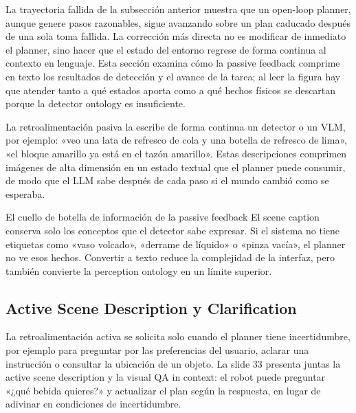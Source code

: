 La trayectoria fallida de la subsección anterior muestra que un open-loop planner, aunque genere pasos razonables, sigue avanzando sobre un plan caducado después de una sola toma fallida. La corrección más directa no es modificar de inmediato el planner, sino hacer que el estado del entorno regrese de forma continua al contexto en lenguaje. Esta sección examina cómo la passive feedback comprime en texto los resultados de detección y el avance de la tarea; al leer la figura hay que atender tanto a qué estados aporta como a qué hechos físicos se descartan porque la detector ontology es insuficiente.

La retroalimentación pasiva la escribe de forma continua un detector o un VLM, por ejemplo: «veo una lata de refresco de cola y una botella de refresco de lima», «el bloque amarillo ya está en el tazón amarillo». Estas descripciones comprimen imágenes de alta dimensión en un estado textual que el planner puede consumir, de modo que el LLM sabe después de cada paso si el mundo cambió como se esperaba.


\begin{knowledgebox}{El cuello de botella de información de la passive feedback}
El scene caption conserva solo los conceptos que el detector sabe expresar. Si el sistema no tiene etiquetas como «vaso volcado», «derrame de líquido» o «pinza vacía», el planner no ve esos hechos. Convertir a texto reduce la complejidad de la interfaz, pero también convierte la perception ontology en un límite superior.
\end{knowledgebox}

\subsection{Active Scene Description y Clarification}

La retroalimentación activa se solicita solo cuando el planner tiene incertidumbre, por ejemplo para preguntar por las preferencias del usuario, aclarar una instrucción o consultar la ubicación de un objeto. La slide 33 presenta juntas la active scene description y la visual QA in context: el robot puede preguntar «¿qué bebida quieres?» y actualizar el plan según la respuesta, en lugar de adivinar en condiciones de incertidumbre.

